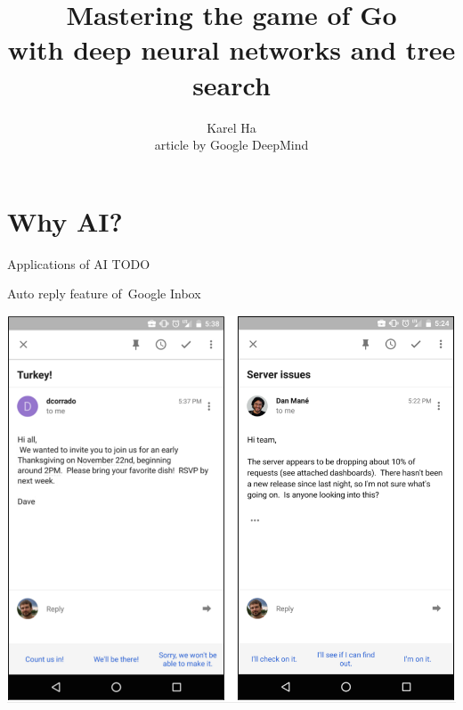 \documentclass{beamer}
\title{Mastering the game of Go \\ with deep neural networks and tree search}
\date{}                         %
\author{Karel Ha \\ article by Google DeepMind}
\institute{Spring School of Combinatorics 2016}
\newcommand{\todo}{\alert{TODO}}
\begin{document}
  {
    \maketitle
  }


  \section{Why AI?}

  \begin{frame}{Applications of AI}
    \todo
  \end{frame}

  {
    \begin{frame}{Auto reply feature of~Google Inbox}
      \begin{center}
        \includegraphics[height=.85\textheight]{../img/Inbox_auto_reply.png}
      \end{center}
    \end{frame}
  }
\end{document}
